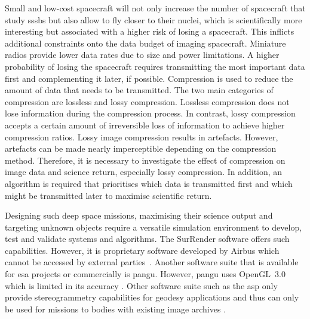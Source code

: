Small and low-cost spacecraft will not only increase the number of spacecraft that study \glspl{sssb} but also allow to fly closer to their nuclei, which is scientifically more interesting but associated with a higher risk of losing a spacecraft. This inflicts additional constraints onto the data budget of imaging spacecraft. Miniature radios provide lower data rates due to size and power limitations. A higher probability of losing the spacecraft requires transmitting the most important data first and complementing it later, if possible. Compression is used to reduce the amount of data that needs to be transmitted. The two main categories of compression are lossless and lossy compression. Lossless compression does not lose information during the compression process. In contrast, lossy compression accepts a certain amount of irreversible loss of information to achieve higher compression ratios. Lossy image compression results in artefacts. However, artefacts can be made nearly imperceptible depending on the compression method. Therefore, it is necessary to investigate the effect of compression on image data and science return, especially lossy compression. In addition, an algorithm is required that prioritises which data is transmitted first and which might be transmitted later to maximise scientific return.

Designing such deep space missions, maximising their science output and targeting unknown objects require a versatile simulation environment to develop, test and validate systems and algorithms. The SurRender software offers such capabilities. However, it is proprietary software developed by Airbus which cannot be accessed by external parties~\cite{Brochard2018ScientificSoftware}. Another software suite that is available for \gls{esa} projects or commercially is \gls{pangu}. However, \gls{pangu} uses OpenGL~3.0 which is limited in its accuracy \cite{Martin2019PlanetaryPANGU}. Other software suite such as the \gls{asp} only provide stereogrammetry capabilities for geodesy applications and thus can only be used for missions to bodies with existing image archives \cite{Beyer2018TheData}.

